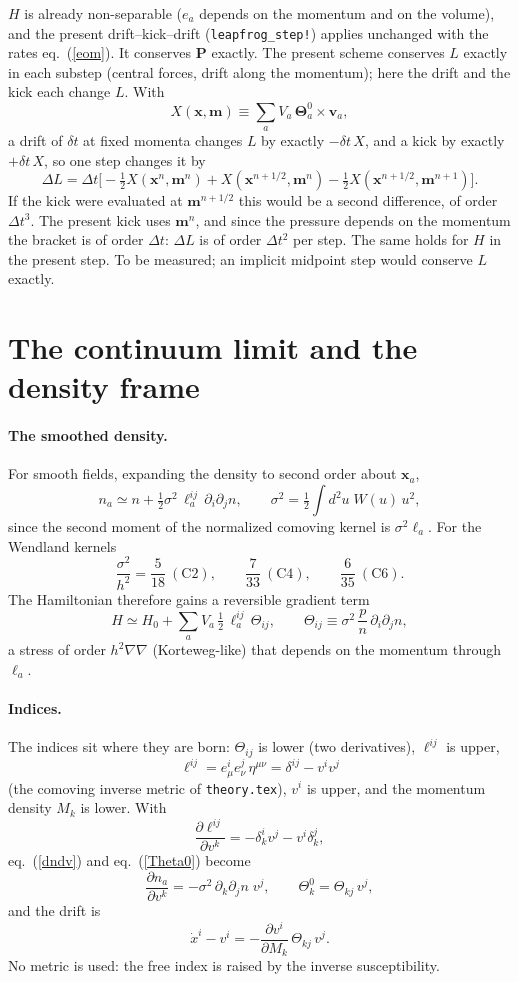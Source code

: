 \documentclass[11pt,aps,preprint,nofootinbib,superscriptaddress,tightenlines]{revtex4-2}
\def\st{\begin{equation}}
\def\stp{\end{equation}}
\def\Eq#1{eq.~(\ref{#1})}
\let\oldparagraph\paragraph
\renewcommand{\paragraph}{\par\bigskip\oldparagraph}
\begin{document}
$H$ is already non-separable ($e_a$ depends on the momentum and on the volume), and the present drift--kick--drift
(\texttt{leapfrog\_step!}) applies unchanged with the rates \Eq{eom}.  It conserves $\bm P$ exactly.  The present scheme conserves $L$
exactly in each substep (central forces, drift along the momentum); here the drift and the kick each change $L$.  With
\st
X(\bm x,\bm m)\equiv\sum_aV_a\,\bm\Theta^0_a\times\bm v_a ,
\stp
a drift of $\delta t$ at fixed momenta changes $L$ by exactly $-\delta t\,X$, and a kick by exactly $+\delta t\,X$, so one step changes it by
\st
\Delta L=\Delta t\Big[-\tfrac12X(\bm x^n,\bm m^n)+X(\bm x^{n+1/2},\bm m^n)-\tfrac12X(\bm x^{n+1/2},\bm m^{n+1})\Big] .
\stp
If the kick were evaluated at $\bm m^{n+1/2}$ this would be a second difference, of order $\Delta t^3$.  The present kick uses $\bm m^n$, and
since the pressure depends on the momentum the bracket is of order $\Delta t$: $\Delta L$ is of order $\Delta t^2$ per step.  The same holds for
$H$ in the present step.  To be measured; an implicit midpoint step would conserve $L$ exactly.

\section{The continuum limit and the density frame}
\label{sec:densityframe}

\paragraph{The smoothed density.}  For smooth fields, expanding the density to second order about $\bm x_a$,
\st
n_a\simeq n+\tfrac12\sigma^2\,\ell_a^{ij}\,\partial_i\partial_jn,\qquad
\sigma^2=\tfrac12\int d^2u\;W(u)\,u^2 ,
\stp
since the second moment of the normalized comoving kernel is $\sigma^2\ell_a$.  For the Wendland kernels
\st
\frac{\sigma^2}{h^2}=\frac5{18}\ (\text{C2}),\qquad \frac7{33}\ (\text{C4}),\qquad \frac6{35}\ (\text{C6}).
\stp
The Hamiltonian therefore gains a reversible gradient term
\st
H\simeq H_0+\sum_aV_a\,\tfrac12\,\ell_a^{ij}\,\Theta_{ij},\qquad
\Theta_{ij}\equiv\sigma^2\,\frac{p}{n}\,\partial_i\partial_jn ,
\stp
a stress of order $h^2\nabla\nabla$ (Korteweg-like) that depends on the momentum through $\ell_a$.

\paragraph{Indices.}  The indices sit where they are born: $\Theta_{ij}$ is lower (two derivatives), $\ell^{ij}$ is upper,
\st
\ell^{ij}=e^i_\mu e^j_\nu\,\eta^{\mu\nu}=\delta^{ij}-v^iv^j
\stp
(the comoving inverse metric of \texttt{theory.tex}), $v^i$ is upper, and the momentum density $M_k$ is lower.  With
\st
\frac{\partial\ell^{ij}}{\partial v^k}=-\delta^i_kv^j-v^i\delta^j_k ,
\stp
\Eq{dndv} and \Eq{Theta0} become
\st
\frac{\partial n_a}{\partial v^k}=-\sigma^2\,\partial_k\partial_jn\;v^j,\qquad
\Theta^0_k=\Theta_{kj}\,v^j ,
\stp
and the drift is
\st
\dot x^i-v^i=-\frac{\partial v^i}{\partial M_k}\,\Theta_{kj}\,v^j .
\label{dx}
\stp
No metric is used: the free index is raised by the inverse susceptibility.
\end{document}
